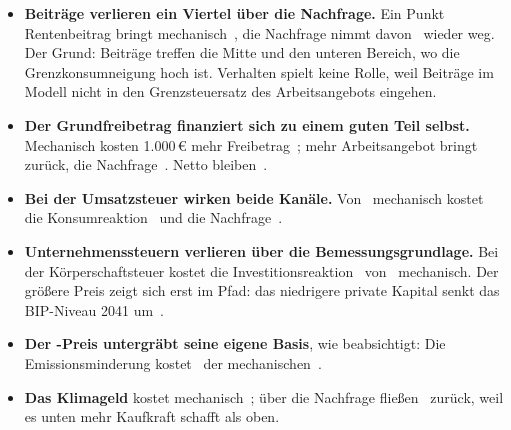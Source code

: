 \begin{itemize}
\item \textbf{Beiträge verlieren ein Viertel über die Nachfrage.} Ein Punkt Rentenbeitrag
  bringt mechanisch \,\Mrd, die Nachfrage nimmt davon
  \,\Mrd{} wieder weg. Der Grund: Beiträge treffen die Mitte und den unteren Bereich, wo die
  Grenzkonsumneigung hoch ist. Verhalten spielt keine Rolle, weil Beiträge im Modell nicht
  in den Grenzsteuersatz des Arbeitsangebots eingehen.
\item \textbf{Der Grundfreibetrag finanziert sich zu einem guten Teil selbst.} Mechanisch
  kosten 1.000\,\euro{} mehr Freibetrag \,\Mrd; mehr
  Arbeitsangebot bringt \,\Mrd{} zurück, die Nachfrage
  \,\Mrd. Netto bleiben \,\Mrd.
\item \textbf{Bei der Umsatzsteuer wirken beide Kanäle.} Von \,\Mrd{}
  mechanisch kostet die Konsumreaktion \,\Mrd{} und die Nachfrage
  \,\Mrd.
\item \textbf{Unternehmenssteuern verlieren über die Bemessungsgrundlage.} Bei der
  Körperschaftsteuer kostet die Investitionsreaktion \,\Mrd{} von
  \,\Mrd{} mechanisch. Der größere Preis zeigt sich erst im Pfad:
  das niedrigere private Kapital senkt das BIP-Niveau 2041 um \,\Mrd.
\item \textbf{Der \COz-Preis untergräbt seine eigene Basis}, wie beabsichtigt: Die
  Emissionsminderung kostet \,\Mrd{} der mechanischen
  \,\Mrd.
\item \textbf{Das Klimageld} kostet mechanisch \,\Mrd; über
  die Nachfrage fließen \,\Mrd{} zurück, weil es unten mehr
  Kaufkraft schafft als oben.
\end{itemize}

\begin{table}[!htb]
\centering\small

\caption{Nichtlinearität: Saldowirkung einer Erhöhung um den Schritt und einer Senkung um
denselben Schritt (mit umgekehrtem Vorzeichen), erste Periode, \Mrd. Gleiche Werte heißen:
in diesem Bereich linear.}
\label{tab:symmetrie}
\end{table}
